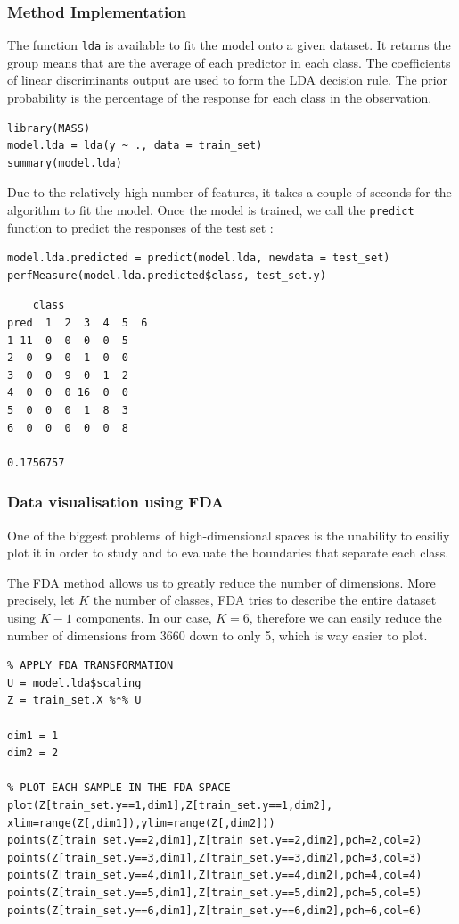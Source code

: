 \documentclass[]{report}
\begin{document}
\subsubsection{Method Implementation}
The function \texttt{lda} is available to fit the model onto a given dataset. It returns the group means that are the average of each predictor in each class. The coefficients of linear discriminants output are used to form the LDA decision rule. The prior probability is the percentage of the response for each class in the observation.

\begin{lstlisting}
library(MASS)
model.lda = lda(y ~ ., data = train_set)
summary(model.lda)
\end{lstlisting}

Due to the relatively high number of features, it takes a couple of seconds for the algorithm to fit the model.  Once the model is trained, we call the \texttt{predict} function to predict the responses of the test set : 

\begin{lstlisting}
model.lda.predicted = predict(model.lda, newdata = test_set)
perfMeasure(model.lda.predicted$class, test_set.y)
\end{lstlisting}

\begin{verbatim}
    class
pred  1  2  3  4  5  6
1 11  0  0  0  0  5
2  0  9  0  1  0  0
3  0  0  9  0  1  2
4  0  0  0 16  0  0
5  0  0  0  1  8  3
6  0  0  0  0  0  8

0.1756757
\end{verbatim}

\subsubsection{Data visualisation using FDA}
One of the biggest problems of high-dimensional spaces is the unability to easiliy plot it in order to study and to evaluate the boundaries that separate each class.

The FDA method allows us to greatly reduce the number of dimensions. More precisely, let $K$ the number of classes, FDA tries to describe the entire dataset using $K-1$ components. In our case, $K = 6$, therefore we can easily reduce the number of dimensions from 3660 down to only 5, which is way easier to plot.

\begin{lstlisting}
% APPLY FDA TRANSFORMATION
U = model.lda$scaling
Z = train_set.X %*% U

dim1 = 1
dim2 = 2

% PLOT EACH SAMPLE IN THE FDA SPACE
plot(Z[train_set.y==1,dim1],Z[train_set.y==1,dim2], xlim=range(Z[,dim1]),ylim=range(Z[,dim2]))
points(Z[train_set.y==2,dim1],Z[train_set.y==2,dim2],pch=2,col=2)
points(Z[train_set.y==3,dim1],Z[train_set.y==3,dim2],pch=3,col=3)
points(Z[train_set.y==4,dim1],Z[train_set.y==4,dim2],pch=4,col=4)
points(Z[train_set.y==5,dim1],Z[train_set.y==5,dim2],pch=5,col=5)
points(Z[train_set.y==6,dim1],Z[train_set.y==6,dim2],pch=6,col=6)
\end{lstlisting}
\end{document}
